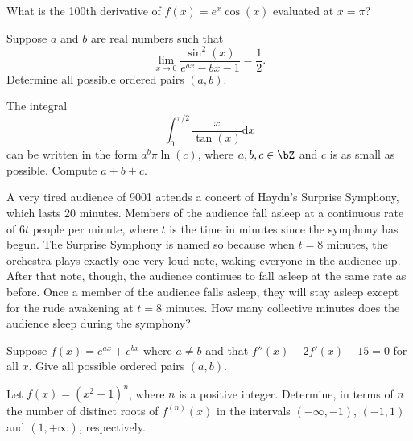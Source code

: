 \documentclass[12pt]{article}
\begin{document}
        \begin{exercise}
            What is the 100th derivative of \(f(x)=e^x\cos(x)\) evaluated at \(x=\pi\)?
        \end{exercise}

        \begin{exercise}
            Suppose \(a\) and \(b\) are real numbers such that 
            \[\lim_{x\to 0}\frac{\sin^2(x)}{e^{ax}-bx-1} = \frac{1}{2}.\]
            Determine all possible ordered pairs \((a,b)\).
        \end{exercise}

        \begin{exercise}
            The integral
            \[\int_0^{\pi/2}\frac{x}{\tan(x)}\mathrm{d}x\]
            can be written in the form \(a^b\pi\ln(c)\), where \(a,b,c\in\bZ\) and \(c\) is as small as possible.
            Compute \(a+b+c\).
        \end{exercise}

        \begin{exercise}
            A very tired audience of 9001 attends a concert of Haydn's Surprise Symphony, which lasts 20 minutes.
            Members of the audience fall asleep at a continuous rate of \(6t\) people per minute, where \(t\) is the time in minutes since the symphony has begun.
            The Surprise Symphony is named so because when \(t=8\) minutes, the orchestra plays exactly one very loud note, waking everyone in the audience up.
            After that note, though, the audience continues to fall asleep at the same rate as before.
            Once a member of the audience falls asleep, they will stay asleep except for the rude awakening at \(t=8\) minutes.
            How many collective minutes does the audience sleep during the symphony?
        \end{exercise}

        \begin{exercise}
            Suppose \(f(x) = e^{ax} + e^{bx}\) where \(a\neq b\) and that \(f''(x)-2f'(x)-15=0\) for all \(x\).
            Give all possible ordered pairs \((a,b)\).
        \end{exercise}

        \begin{exercise}
            Let \(f(x)=(x^2-1)^n\), where \(n\) is a positive integer.
            Determine, in terms of \(n\) the number of distinct roots of \(f^{(n)}(x)\) in the intervals \((-\infty,-1)\), \((-1,1)\) and \((1,+\infty)\), respectively.
        \end{exercise}
            
\end{document}
